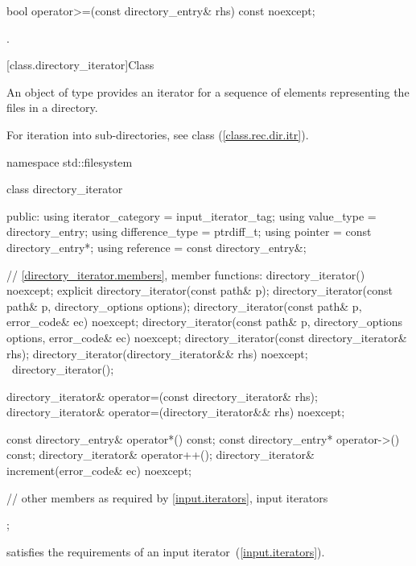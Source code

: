\begin{itemdecl}
bool operator>=(const directory_entry& rhs) const noexcept;
\end{itemdecl}

\begin{itemdescr}
\pnum
\returns {}.
\end{itemdescr}

[class.directory_iterator]{Class }

\pnum
An object of type  provides an iterator for a
sequence of  elements representing the files in a
directory.
\begin{note} For iteration into sub-directories, see class 
(\ref{class.rec.dir.itr}). \end{note}

\begin{codeblock}
namespace std::filesystem {
  class directory_iterator {
  public:
    using iterator_category = input_iterator_tag;
    using value_type        = directory_entry;
    using difference_type   = ptrdiff_t;
    using pointer           = const directory_entry*;
    using reference         = const directory_entry&;

    // \ref{directory_iterator.members}, member functions:
    directory_iterator() noexcept;
    explicit directory_iterator(const path& p);
    directory_iterator(const path& p, directory_options options);
    directory_iterator(const path& p, error_code& ec) noexcept;
    directory_iterator(const path& p, directory_options options,
                       error_code& ec) noexcept;
    directory_iterator(const directory_iterator& rhs);
    directory_iterator(directory_iterator&& rhs) noexcept;
   ~directory_iterator();

    directory_iterator& operator=(const directory_iterator& rhs);
    directory_iterator& operator=(directory_iterator&& rhs) noexcept;

    const directory_entry& operator*() const;
    const directory_entry* operator->() const;
    directory_iterator&    operator++();
    directory_iterator&    increment(error_code& ec) noexcept;

    // other members as required by \ref{input.iterators}, input iterators
  };
}
\end{codeblock}

\pnum
  satisfies the requirements of an input
iterator~(\ref{input.iterators}).

